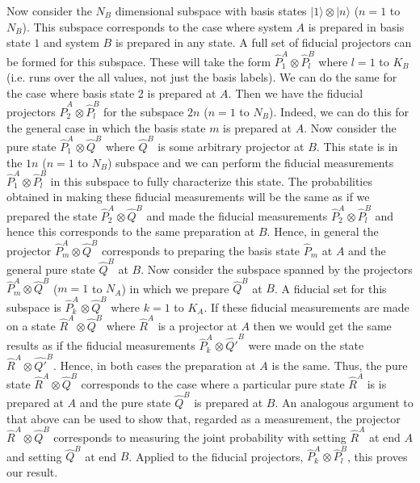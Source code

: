 \documentclass[12pt]{article}
\begin{document}
Now consider the $N_B$ dimensional subspace
with basis states $|1\rangle\otimes|n\rangle$ ($n=1$ to $N_B$). This
subspace corresponds to the case where system $A$ is prepared in basis
state $1$ and system $B$ is prepared in any state.  A full
set of fiducial projectors can be formed for this subspace.  These will
take the form $\hat{P}^A_1\otimes\hat{P}^B_l$ where $l=1$ to $K_B$ (i.e.
runs over the all values, not just the basis labels).  We can do the
same for the case where basis state 2 is prepared at $A$.  Then we have
the fiducial projectors $\hat{P}^A_2\otimes\hat{P}^B_l$ for the subspace
$2n$ ($n=1$ to $N_B$). Indeed, we can do this for the general case in
which the basis state $m$ is prepared at $A$.  Now consider the pure
state $\hat{P}^A_1\otimes\hat{Q}^B$ where $\hat{Q}^B$ is some arbitrary
projector at $B$.  This state is in the $1n$ ($n=1$ to $N_B$) subspace
and we can perform the fiducial measurements
$\hat{P}^A_1\otimes\hat{P}_l^B$ in this subspace to fully characterize
this state.  The probabilities obtained in making these fiducial
measurements will be the same as if we prepared the state
$\hat{P}^A_2\otimes\hat{Q}^B$ and made the fiducial measurements
$\hat{P}^A_2\otimes\hat{P}_l^B$ and hence this corresponds to the same
preparation at $B$.  Hence, in general the projector
$\hat{P}^A_m\otimes\hat{Q}^B$ corresponds to preparing the basis state
$\hat{P}_m$ at $A$ and the general pure state $\hat{Q}^B$ at $B$.
Now consider the subspace spanned by
the projectors $\hat{P}^A_m\otimes\hat{Q}^B$ ($m=1$ to $N_A$) in which
we prepare $\hat{Q}^B$ at $B$.  A fiducial set for this subspace is
$\hat{P}^A_k\otimes\hat{Q}^B$ where $k=1$ to $K_A$.  If these fiducial
measurements are made on a state $\hat{R}^A\otimes\hat{Q}^B$ where
$\hat{R}^A$ is a projector at $A$ then we would get the same results as
if the fiducial measurements $\hat{P}^A_k\otimes\hat{Q'}^B$ were made on
the state $\hat{R}^A\otimes\hat{Q'}^B$.  Hence, in both cases the
preparation at $A$ is the same.  Thus, the pure state
$\hat{R}^A\otimes\hat{Q}^B$ corresponds to the case where a particular
pure state $\hat{R}^A$ is is prepared at $A$ and the pure state
$\hat{Q}^B$ is prepared at $B$.  An analogous argument to that above can
be used to show that, regarded as a measurement, the
projector $\hat{R}^A\otimes\hat{Q}^B$ corresponds to
measuring the joint probability with setting $\hat{R}^A$ at end $A$ and
setting $\hat{Q}^B$ at end $B$.   Applied to the fiducial projectors,
$\hat{P}_k^A\otimes\hat{P}_l^B$, this proves our result.
\end{document}
